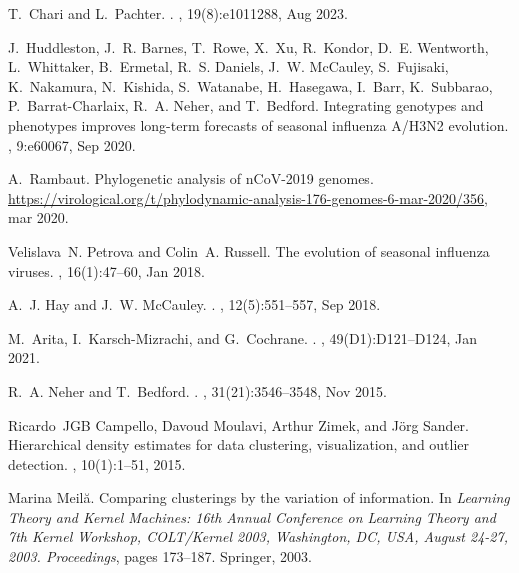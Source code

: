 \documentclass[webpdf,contemporary,large,single]{oup-authoring-template}%
\theoremstyle{thmstyleone}%
\theoremstyle{thmstyletwo}%
\theoremstyle{thmstylethree}%
\begin{document}
\begin{thebibliography}{10}
T.~Chari and L.~Pachter.
.
, 19(8):e1011288, Aug 2023.

J.~Huddleston, J.~R. Barnes, T.~Rowe, X.~Xu, R.~Kondor, D.~E. Wentworth,
  L.~Whittaker, B.~Ermetal, R.~S. Daniels, J.~W. McCauley, S.~Fujisaki,
  K.~Nakamura, N.~Kishida, S.~Watanabe, H.~Hasegawa, I.~Barr, K.~Subbarao,
  P.~Barrat-Charlaix, R.~A. Neher, and T.~Bedford.
\newblock Integrating genotypes and phenotypes improves long-term forecasts of
  seasonal influenza {A/H3N2} evolution.
, 9:e60067, Sep 2020.

A.~Rambaut.
\newblock Phylogenetic analysis of n{C}o{V}-2019 genomes.
\newblock
  \url{https://virological.org/t/phylodynamic-analysis-176-genomes-6-mar-2020/356},
  mar 2020.

Velislava~N. Petrova and Colin~A. Russell.
\newblock The evolution of seasonal influenza viruses.
, 16(1):47--60, Jan 2018.

A.~J. Hay and J.~W. McCauley.
.
, 12(5):551--557, Sep 2018.

M.~Arita, I.~Karsch-Mizrachi, and G.~Cochrane.
.
, 49(D1):D121--D124, Jan 2021.

R.~A. Neher and T.~Bedford.
.
, 31(21):3546--3548, Nov 2015.

Ricardo~JGB Campello, Davoud Moulavi, Arthur Zimek, and J{\"o}rg Sander.
\newblock Hierarchical density estimates for data clustering, visualization,
  and outlier detection.
,
  10(1):1--51, 2015.

Marina Meil{\u{a}}.
\newblock Comparing clusterings by the variation of information.
\newblock In {\em Learning Theory and Kernel Machines: 16th Annual Conference
  on Learning Theory and 7th Kernel Workshop, COLT/Kernel 2003, Washington, DC,
  USA, August 24-27, 2003. Proceedings}, pages 173--187. Springer, 2003.


\end{thebibliography}
\end{document}
